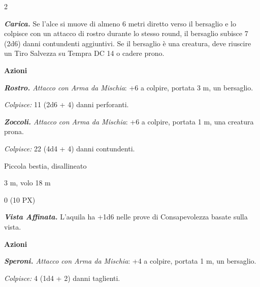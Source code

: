 \begin{multicols}{2}
{\emph{\textbf{Carica.}} Se l'alce si muove di almeno 6 metri diretto verso il bersaglio e lo colpisce con un attacco di rostro durante lo stesso round, il bersaglio subisce 7 (2d6) danni contundenti aggiuntivi. Se il bersaglio è una creatura, deve riuscire un Tiro Salvezza su Tempra DC 14 o cadere prono.

\textbf{Azioni}

\emph{\textbf{Rostro.} Attacco con Arma da Mischia}: +6 a colpire, portata 3 m, un bersaglio.

\emph{Colpisce:} 11 (2d6 + 4) danni perforanti.

\emph{\textbf{Zoccoli.} Attacco con Arma da Mischia}: +6 a colpire, portata 1 m, una creatura prona.

\emph{Colpisce:} 22 (4d4 + 4) danni contundenti.

\begin{description}[noitemsep, topsep=0pt, parsep=0pt, partopsep=0pt, itemsep=1pt, leftmargin=2.35cm,  labelwidth=2.2cm, itemindent=0cm, listparindent=0pt] %
\setlength{\baselineskip}{10pt}
\item[\textbf{Taglia/Tipo}] Piccola bestia, disallineato
\item[\textbf{Caratt.}] 
\item[\textbf{Tiri Salvez.}] 
\item[\textbf{Punti Ferita}] 
\item[\textbf{Movimento}] 3 m, volo 18 m
\item[\textbf{Sfida}] 0 (10 PX)
\end{description}
\smallskip

\emph{\textbf{Vista Affinata.}} L'aquila ha +1d6 nelle prove di Consapevolezza basate sulla vista.

\textbf{Azioni}

\emph{\textbf{Speroni.} Attacco con Arma da Mischia}: +4 a colpire, portata 1 m, un bersaglio.

\emph{Colpisce:} 4 (1d4 + 2) danni taglienti.

}
\end{multicols}
